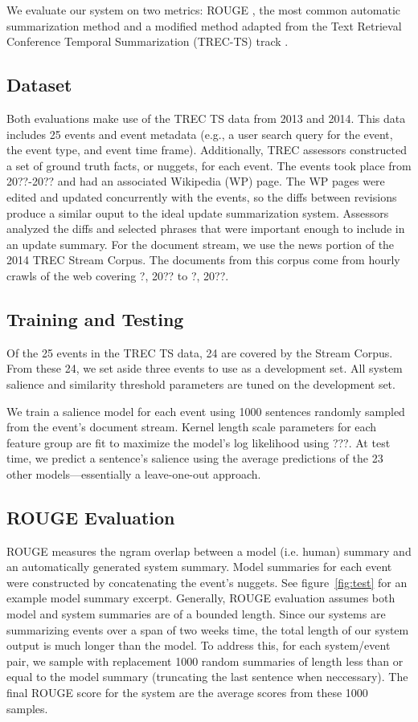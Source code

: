 We evaluate our system on two metrics: ROUGE \cite{?}, the most common automatic
summarization method and a modified method adapted 
from the Text Retrieval Conference Temporal Summarization (TREC-TS) track \cite{?}.

\subsection{Dataset}

Both evaluations make use of the TREC TS data from 2013 and 2014. 
This data includes 25 events and event metadata (e.g., a user
search query for the event, the event type, and event time frame).
Additionally, TREC assessors constructed a set of ground truth facts, or 
nuggets, for each event. The events took place from 20??-20?? and had 
an associated Wikipedia (WP) page. The WP pages were edited and updated 
concurrently with the events, so the diffs between revisions produce a similar
ouput to the ideal update summarization system. Assessors analyzed the diffs
and selected phrases that were important enough to include in an update 
summary.  
For the document stream, we use the news portion of the
 2014 TREC Stream Corpus.
The documents from this corpus come from hourly crawls of the web covering 
 ?, 20?? to ?, 20??. 

\subsection{Training and Testing}

Of the 25 events in the TREC TS data, 24 are covered by the Stream Corpus.
From these 24, we set aside three events to use as a development set.
All system salience and similarity threshold parameters are tuned on the
development set.

We train a salience model for each event using 1000 sentences randomly sampled
from the event's document stream. Kernel length scale parameters  for each
feature group are fit to maximize
the model's log likelihood using ???.
At test time, we predict a sentence's salience using the average predictions
of the 23 other models---essentially a leave-one-out approach.   

\subsection{ROUGE Evaluation}

ROUGE measures the ngram overlap between a model (i.e. human) summary 
and an automatically generated system summary. 
Model summaries for each event were constructed by concatenating the event's 
nuggets. 
See figure~\ref{fig:test} for an example model summary excerpt.
Generally, ROUGE evaluation assumes both model and system summaries
are of a bounded length. Since our systems are summarizing events over a span
of two weeks time, the total length of our system output is much longer than
the model. To address this, for each system/event pair, we sample with replacement
1000 random summaries of length less than or equal to the model summary 
(truncating the last sentence when neccessary). The final ROUGE score for the 
system are the average scores from these 1000 samples.

